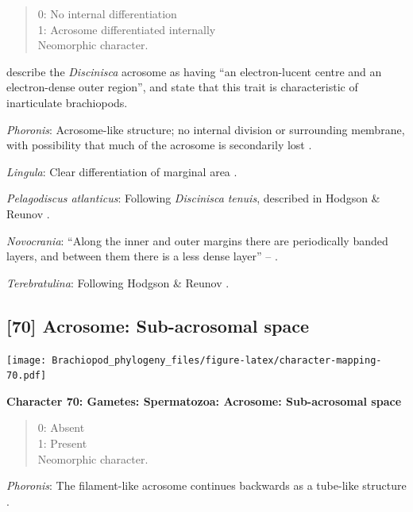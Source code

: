 \documentclass[]{book}
\theoremstyle{definition}
\theoremstyle{definition}
\theoremstyle{definition}
\theoremstyle{remark}
\begin{document}
\begin{quote}
0: No internal differentiation\\
1: Acrosome differentiated internally\\
Neomorphic character.
\end{quote}

\citet{Hodgson1994Ultrastructureof} describe the \emph{Discinisca}
acrosome as having ``an electron-lucent centre and an electron-dense
outer region'', and state that this trait is characteristic of
inarticulate brachiopods.

\emph{Phoronis}: Acrosome-like structure; no internal division or
surrounding membrane, with possibility that much of the acrosome is
secondarily lost \citep{Reunov2004Ultrastructuralstudy}.

\emph{Lingula}: Clear differentiation of marginal area
\citep{Fukumoto2003Theacrosome}.

\emph{Pelagodiscus atlanticus}: Following \emph{Discinisca}
\emph{tenuis}, described in Hodgson \& Reunov
\citeyearpar{Hodgson1994Ultrastructureof}.

\emph{Novocrania}: ``Along the inner and outer margins there are
periodically banded layers, and between them there is a less dense
layer'' -- \citet{Afzelius1978Finestructure}.

\emph{Terebratulina}: Following Hodgson \& Reunov
\citeyearpar{Hodgson1994Ultrastructureof}.

\hypertarget{acrosome-sub-acrosomal-space}{%
\subsection*{{[}70{]} Acrosome: Sub-acrosomal
space}\label{acrosome-sub-acrosomal-space}}

\texttt{[image: Brachiopod\_phylogeny\_files/figure-latex/character-mapping-70.pdf]}

\textbf{Character 70: Gametes: Spermatozoa: Acrosome: Sub-acrosomal
space}

\begin{quote}
0: Absent\\
1: Present\\
Neomorphic character.
\end{quote}

\emph{Phoronis}: The filament-like acrosome continues backwards as a
tube-like structure \citep[summarized in
\citet{Jamieson1991FishEvolution}]{Franzen1980Ultrastructureof}.
\end{document}
